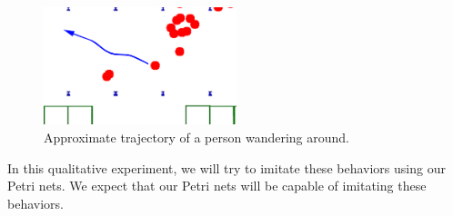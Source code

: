 \documentclass[11pt, a4paper]{book}
\begin{document}
\begin{figure}
\centering
\includegraphics[width=0.5\textwidth]{"./qualitative experiment pictures/wander_tracked_cropped"}
\caption{Approximate trajectory of a person wandering around.}
\label{fig:reallifewandertrajectory}
\end{figure}


In this qualitative experiment, we will try to imitate these behaviors using our Petri nets. We expect that our Petri nets will be capable of imitating these behaviors.




\end{document}
